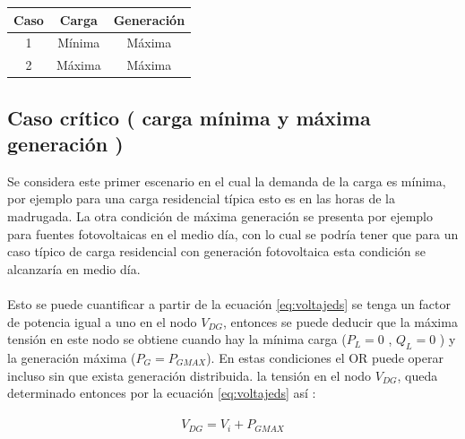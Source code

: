 \documentclass[12pt, letterpaper]{report}
\begin{document}
\begin{tabular}{|c|c|c|}
    \hline 
    Caso 	& Carga 	& Generación \\\hline
    1 		& Mínima	& Máxima \\\hline
    2		& Máxima	& Máxima \\
    \hline
\end{tabular}

\subsection{Caso crítico ( carga mínima  y máxima generación ) }
Se considera este primer escenario en el cual la demanda de la carga es mínima, por ejemplo  para una carga residencial típica  esto es  en las horas de la madrugada. La otra condición de máxima generación se presenta por ejemplo para fuentes fotovoltaicas  en el medio día,  con lo cual se podría tener que para un caso típico de carga residencial con generación fotovoltaica esta condición se alcanzaría en medio día.\\\\
Esto se puede  cuantificar a partir de la ecuación \ref{eq:voltajeds} se tenga un factor de potencia igual a uno  en el nodo  $V_{DG}$, entonces se puede deducir que la máxima tensión en este nodo se obtiene cuando hay la mínima carga ($P_{L} = 0$ , $Q_{L} = 0$ )  y la generación máxima ($P_{G} = P_{GMAX}$). En estas condiciones el OR puede operar incluso sin que exista generación distribuida. la tensión en el nodo $V_{DG}$, queda determinado entonces por la ecuación \ref{eq:voltajeds} así \cite{strbac2002integration} :\\\\
\begin{equation}
V_{DG} = V_{i} + P_{GMAX}
\label{eq:vgmax}
\end{equation}
\end{document}

